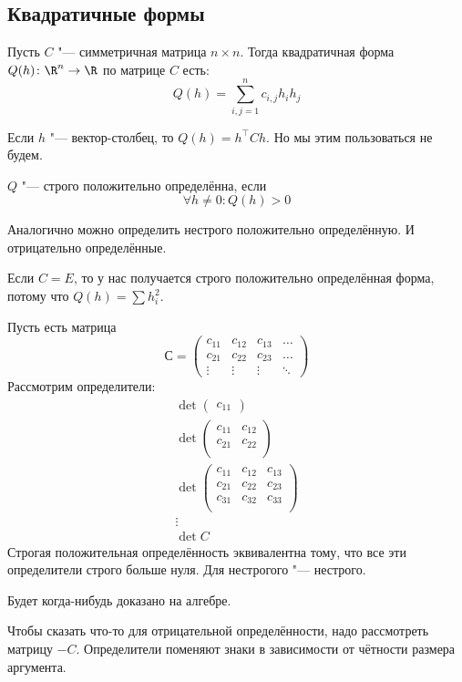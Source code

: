 \subsection{Квадратичные формы}
\begin{Def}
	Пусть $C$ "--- симметричная матрица $n \times n$.
	Тогда квадратичная форма $Q(h) \colon \R^n \to \R$ по матрице $C$ есть:
	\[ Q(h) = \sum_{i,j=1}^n c_{i,j} h_i h_j \]
\end{Def}
\begin{Rem}
	Если $h$ "--- вектор-столбец, то $Q(h) = h^\top C h$.
	Но мы этим пользоваться не будем.
\end{Rem}
\begin{Def}
	$Q$ "--- строго положительно определённа, если
	\[ \forall h \neq 0 \colon Q(h) > 0\]
\end{Def}
\begin{Rem}
	Аналогично можно определить нестрого положительно определённую.
	И отрицательно определённые.
\end{Rem}
\begin{exmp}
	Если $C=E$, то у нас получается строго положительно определённая форма,
	потому что $Q(h) = \sum h_i^2$.
\end{exmp}

\begin{theorem}
	Пусть есть матрица
	\[
	С=
	\begin{pmatrix}
		c_{11} & c_{12} & c_{13} & \dots \\
		c_{21} & c_{22} & c_{23} & \dots \\
		\vdots & \vdots & \vdots & \ddots
	\end{pmatrix}
	\]
	Рассмотрим определители:
	\begin{gather*}
	\det
		\begin{pmatrix}
			c_{11}
		\end{pmatrix} \\
	\det
		\begin{pmatrix}
			c_{11} & c_{12} \\
			c_{21} & c_{22} \\
		\end{pmatrix} \\
	\det
		\begin{pmatrix}
			c_{11} & c_{12} & c_{13} \\
			c_{21} & c_{22} & c_{23} \\
			c_{31} & c_{32} & c_{33} \\
		\end{pmatrix} \\
	\vdots \\
	\det C
	\end{gather*}
	Строгая положительная определённость эквивалентна тому, что
	все эти определители строго больше нуля.
	Для нестрогого "--- нестрого.
\end{theorem}
\begin{Rem}
	Будет когда-нибудь доказано на алгебре.
\end{Rem}
\begin{Rem}
	Чтобы сказать что-то для отрицательной определённости, надо рассмотреть матрицу $-C$.
	Определители поменяют знаки в зависимости от чётности размера аргумента.
\end{Rem}

